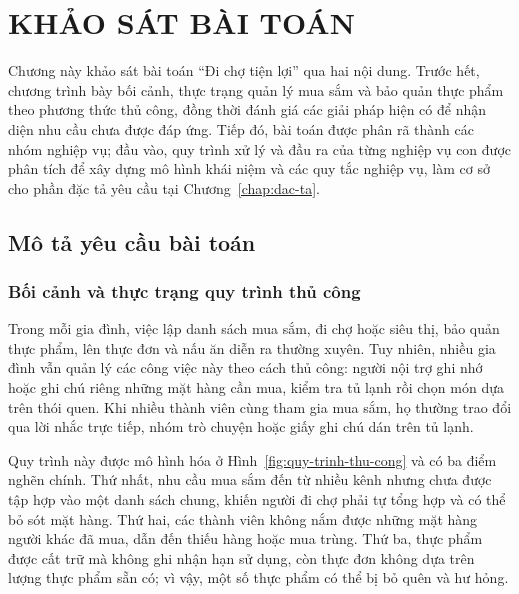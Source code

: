 \chapter{KHẢO SÁT BÀI TOÁN}\label{chap:khao-sat}

Chương này khảo sát bài toán “Đi chợ tiện lợi” qua hai nội dung. Trước hết, chương trình bày bối cảnh, thực trạng quản lý mua sắm và bảo quản thực phẩm theo phương thức thủ công, đồng thời đánh giá các giải pháp hiện có để nhận diện nhu cầu chưa được đáp ứng. Tiếp đó, bài toán được phân rã thành các nhóm nghiệp vụ; đầu vào, quy trình xử lý và đầu ra của từng nghiệp vụ con được phân tích để xây dựng mô hình khái niệm và các quy tắc nghiệp vụ, làm cơ sở cho phần đặc tả yêu cầu tại Chương~\ref{chap:dac-ta}.

\section{Mô tả yêu cầu bài toán}\label{sec:mo-ta-yeu-cau}

\subsection{Bối cảnh và thực trạng quy trình thủ công}\label{ssec:thuc-trang}

Trong mỗi gia đình, việc lập danh sách mua sắm, đi chợ hoặc siêu thị, bảo quản thực phẩm, lên thực đơn và nấu ăn diễn ra thường xuyên. Tuy nhiên, nhiều gia đình vẫn quản lý các công việc này theo cách thủ công: người nội trợ ghi nhớ hoặc ghi chú riêng những mặt hàng cần mua, kiểm tra tủ lạnh rồi chọn món dựa trên thói quen. Khi nhiều thành viên cùng tham gia mua sắm, họ thường trao đổi qua lời nhắc trực tiếp, nhóm trò chuyện hoặc giấy ghi chú dán trên tủ lạnh.

Quy trình này được mô hình hóa ở Hình~\ref{fig:quy-trinh-thu-cong} và có ba điểm nghẽn chính. Thứ nhất, nhu cầu mua sắm đến từ nhiều kênh nhưng chưa được tập hợp vào một danh sách chung, khiến người đi chợ phải tự tổng hợp và có thể bỏ sót mặt hàng. Thứ hai, các thành viên không nắm được những mặt hàng người khác đã mua, dẫn đến thiếu hàng hoặc mua trùng. Thứ ba, thực phẩm được cất trữ mà không ghi nhận hạn sử dụng, còn thực đơn không dựa trên lượng thực phẩm sẵn có; vì vậy, một số thực phẩm có thể bị bỏ quên và hư hỏng.

